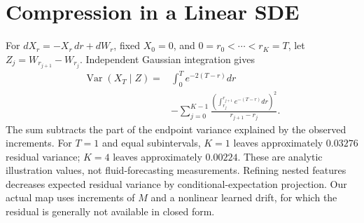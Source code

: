 \section{Compression in a Linear SDE}\label{app:compression}
For $dX_r=-X_r\,dr+dW_r$, fixed $X_0=0$, and $0=r_0<\cdots<r_K=T$, let $Z_j=W_{r_{j+1}}-W_{r_j}$. Independent Gaussian integration gives
\begin{align}
 \operatorname{Var}(X_T\mid Z)
 ={}&\int_0^T e^{-2(T-r)}dr\nonumber\\
 &-\sum_{j=0}^{K-1}
 \frac{\left(\int_{r_j}^{r_{j+1}}e^{-(T-r)}dr\right)^2}
 {r_{j+1}-r_j}.
\end{align}
The sum subtracts the part of the endpoint variance explained by the observed increments. For $T=1$ and equal subintervals, $K=1$ leaves approximately $0.03276$ residual variance; $K=4$ leaves approximately $0.00224$. These are analytic illustration values, not fluid-forecasting measurements. Refining nested features decreases expected residual variance by conditional-expectation projection. Our actual map uses increments of $M$ and a nonlinear learned drift, for which the residual is generally not available in closed form.
